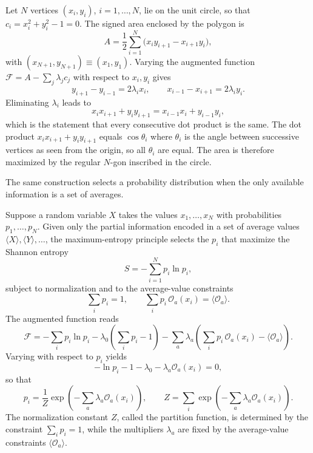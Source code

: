 \begin{example}
Let $N$ vertices $(x_i,y_i)$, $i=1,\ldots,N$, lie on the unit circle, so that $c_i=x_i^2+y_i^2-1=0$. The signed area enclosed by the polygon is
\begin{equation}
A=\frac12\sum_{i=1}^N\bigl(x_iy_{i+1}-x_{i+1}y_i\bigr),
\end{equation}
with $(x_{N+1},y_{N+1})\equiv(x_1,y_1)$. Varying the augmented function $\mathcal{F}=A-\sum_j\lambda_j c_j$ with respect to $x_i,y_i$ gives
\begin{equation}
y_{i+1}-y_{i-1}=2\lambda_i x_i,
\qquad x_{i-1}-x_{i+1}=2\lambda_i y_i.
\end{equation}
Eliminating $\lambda_i$ leads to
\begin{equation}
x_ix_{i+1}+y_iy_{i+1}=x_{i-1}x_i+y_{i-1}y_i,
\end{equation}
which is the statement that every consecutive dot product is the same. The dot product $x_ix_{i+1}+y_iy_{i+1}$ equals $\cos\theta_i$ where $\theta_i$ is the angle between successive vertices as seen from the origin, so all $\theta_i$ are equal. The area is therefore maximized by the regular $N$-gon inscribed in the circle.
\end{example}

The same construction selects a probability distribution when the only available information is a set of averages.

\begin{example}
Suppose a random variable $X$ takes the values $x_1,\ldots,x_N$ with probabilities $p_1,\ldots,p_N$. Given only the partial information encoded in a set of average values $\langle X\rangle,\langle Y\rangle,\ldots$, the maximum-entropy principle selects the $p_i$ that maximize the Shannon entropy
\begin{equation}
S=-\sum_{i=1}^N p_i\ln p_i,
\end{equation}
subject to normalization and to the average-value constraints
\begin{equation}
\sum_i p_i=1,
\qquad
\sum_i p_i\,\mathcal{O}_a(x_i)=\langle\mathcal{O}_a\rangle.
\end{equation}
The augmented function reads
\begin{equation}
\mathcal{F}=-\sum_i p_i\ln p_i-\lambda_0\!\left(\sum_i p_i-1\right)-\sum_a\lambda_a\!\left(\sum_i p_i\,\mathcal{O}_a(x_i)-\langle\mathcal{O}_a\rangle\right).
\end{equation}
Varying with respect to $p_i$ yields
\begin{equation}
-\ln p_i-1-\lambda_0-\lambda_a\mathcal{O}_a(x_i)=0,
\end{equation}
so that
\begin{equation}
p_i=\frac{1}{Z}\exp\!\left(-\sum_a\lambda_a\mathcal{O}_a(x_i)\right),
\qquad
Z=\sum_i\exp\!\left(-\sum_a\lambda_a\mathcal{O}_a(x_i)\right).
\end{equation}
The normalization constant $Z$, called the partition function, is determined by the constraint $\sum_i p_i=1$, while the multipliers $\lambda_a$ are fixed by the average-value constraints $\langle\mathcal{O}_a\rangle$.
\end{example}

